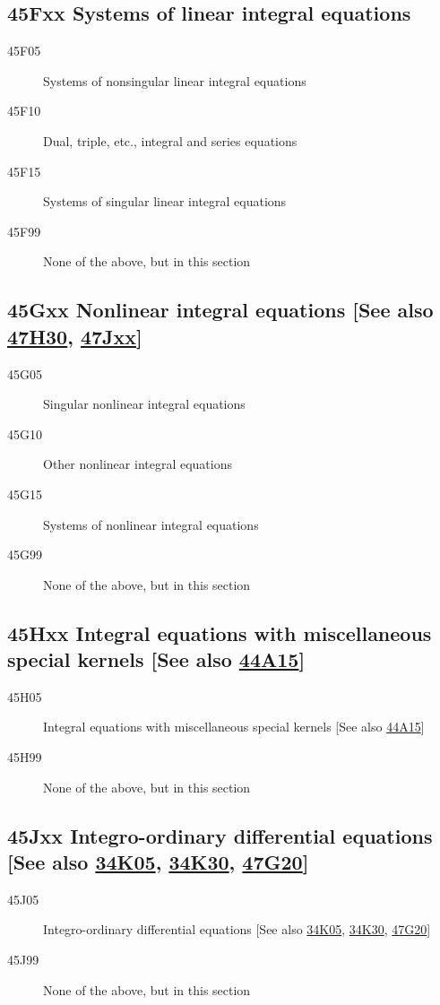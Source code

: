 \documentclass[letterpaper]{article}
\begin{document}
\subsection*{45Fxx  Systems of linear integral equations }\label{45Fxx}
\begin{description}  
\item [45F05]\label{45F05} Systems of nonsingular linear integral equations
\item [45F10]\label{45F10} Dual, triple, etc., integral and series equations
\item [45F15]\label{45F15} Systems of singular linear integral equations
\item [45F99]\label{45F99} None of the above, but in this section
\end{description}
\subsection*{45Gxx  Nonlinear integral equations [See also \hyperref[47H30]{47H30}, \hyperref[47Jxx]{47Jxx}] }\label{45Gxx}
\begin{description}  
\item [45G05]\label{45G05} Singular nonlinear integral equations
\item [45G10]\label{45G10} Other nonlinear integral equations
\item [45G15]\label{45G15} Systems of nonlinear integral equations
\item [45G99]\label{45G99} None of the above, but in this section
\end{description}
\subsection*{45Hxx  Integral equations with miscellaneous special kernels [See also \hyperref[44A15]{44A15}] }\label{45Hxx}
\begin{description}  
\item [45H05]\label{45H05} Integral equations with miscellaneous special kernels [See also \hyperref[44A15]{44A15}]
\item [45H99]\label{45H99} None of the above, but in this section
\end{description}
\subsection*{45Jxx  Integro-ordinary differential equations [See also \hyperref[34K05]{34K05}, \hyperref[34K30]{34K30}, \hyperref[47G20]{47G20}] }\label{45Jxx}
\begin{description}  
\item [45J05]\label{45J05} Integro-ordinary differential equations [See also \hyperref[34K05]{34K05}, \hyperref[34K30]{34K30}, \hyperref[47G20]{47G20}]
\item [45J99]\label{45J99} None of the above, but in this section
\end{description}
\end{document}
